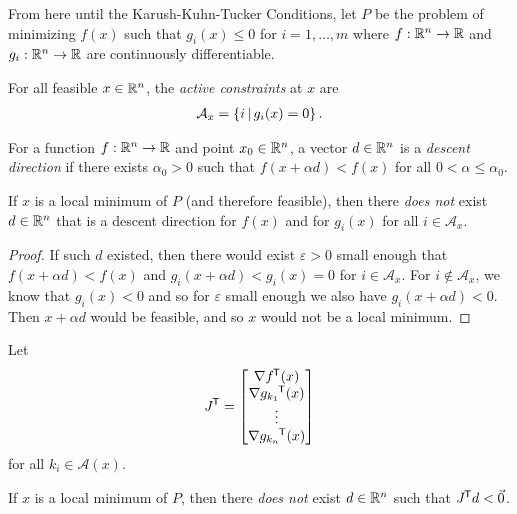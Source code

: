 \begin{rmk}
    From here until the Karush-Kuhn-Tucker Conditions, let $P$ be the problem of minimizing $f(x)$ such that $g_i(x) \leq 0$ for $i = 1, \ldots, m$ where $f: \mathbb{R}^n \to \mathbb{R}$ and $g_i: \mathbb{R}^n \to \mathbb{R}$ are continuously differentiable.
\end{rmk}

\begin{defn}
    For all feasible $x \in \mathbb{R}^n$, the \emph{active constraints} at $x$ are
    \begin{align*}
        \mathcal{A}_x = \left\{i \,\middle|\, g_i(x) = 0\right\}.
    \end{align*}
\end{defn}

\begin{defn}
    For a function $f: \mathbb{R}^n \to \mathbb{R}$ and point $x_0 \in \mathbb{R}^n$, a vector $d \in \mathbb{R}^n$ is a \emph{descent direction} if there exists $\alpha_0 > 0$ such that $f(x + \alpha d) < f(x)$ for all $0 < \alpha \leq \alpha_0$.
\end{defn}

\begin{lemma}\label{kkt-lemma-1}
    If $x$ is a local minimum of $P$ (and therefore feasible), then there \emph{does not} exist $d \in \mathbb{R}^n$ that is a descent direction for $f(x)$ and for $g_i(x)$ for all $i \in \mathcal{A}_x$. 
\end{lemma}

\begin{proof}
    If such $d$ existed, then there would exist $\varepsilon > 0$ small enough that $f(x + \alpha d) < f(x)$ and $g_i(x + \alpha d) < g_i(x) = 0$ for $i \in \mathcal{A}_x$. For $i \notin \mathcal{A}_x$, we know that $g_i(x) < 0$ and so for $\varepsilon$ small enough we also have $g_i(x + \alpha d) < 0$. Then $x + \alpha d$ would be feasible, and so $x$ would not be a local minimum.
\end{proof}

\begin{lemma}\label{kkt-lemma-2}
    Let
    \begin{align*}
        {J}^{\mkern-1.5mu\mathsf{T}} = \begin{bmatrix}
            \nabla {f}^{\mkern-1.5mu\mathsf{T}}(x) \\ \nabla {g_{k_1}}^{\mkern-1.5mu\mathsf{T}}(x) \\ \vdots \\ \nabla {g_{k_n}}^{\mkern-1.5mu\mathsf{T}}(x)
        \end{bmatrix}
    \end{align*}
    for all $k_i \in \mathcal{A}(x)$.

    If $x$ is a local minimum of $P$, then there \emph{does not} exist $d \in \mathbb{R}^n$ such that ${J}^{\mkern-1.5mu\mathsf{T}}d < \vec{0}$.
\end{lemma}

